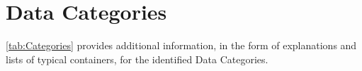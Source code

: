 %
%
\chapter{Data Categories} \label{bkm:categories}


\autoref{tab:Categories} provides additional \gls{information}, in the form of explanations and lists of typical containers, for the identified Data Categories.


